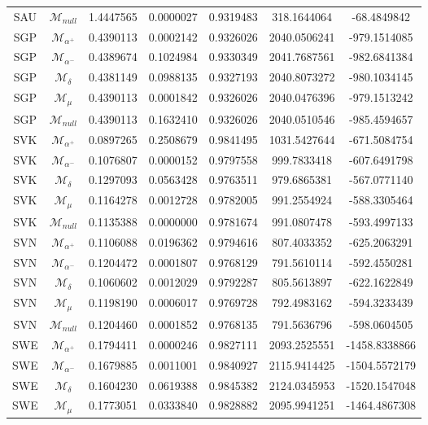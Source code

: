 \begin{tabular}{ccccccc}
SAU & $\mathcal{M}_{null}$ & 1.4447565 & 0.0000027 & 0.9319483 & 318.1644064 & -68.4849842\\
SGP & $\mathcal{M}_{\alpha^+}$ & 0.4390113 & 0.0002142 & 0.9326026 & 2040.0506241 & -979.1514085\\
SGP & $\mathcal{M}_{\alpha^-}$ & 0.4389674 & 0.1024984 & 0.9330349 & 2041.7687561 & -982.6841384\\
SGP & $\mathcal{M}_{\delta}$ & 0.4381149 & 0.0988135 & 0.9327193 & 2040.8073272 & -980.1034145\\
SGP & $\mathcal{M}_{\mu}$ & 0.4390113 & 0.0001842 & 0.9326026 & 2040.0476396 & -979.1513242\\
SGP & $\mathcal{M}_{null}$ & 0.4390113 & 0.1632410 & 0.9326026 & 2040.0510546 & -985.4594657\\
SVK & $\mathcal{M}_{\alpha^+}$ & 0.0897265 & 0.2508679 & 0.9841495 & 1031.5427644 & -671.5084754\\
SVK & $\mathcal{M}_{\alpha^-}$ & 0.1076807 & 0.0000152 & 0.9797558 & 999.7833418 & -607.6491798\\
SVK & $\mathcal{M}_{\delta}$ & 0.1297093 & 0.0563428 & 0.9763511 & 979.6865381 & -567.0771140\\
SVK & $\mathcal{M}_{\mu}$ & 0.1164278 & 0.0012728 & 0.9782005 & 991.2554924 & -588.3305464\\
SVK & $\mathcal{M}_{null}$ & 0.1135388 & 0.0000000 & 0.9781674 & 991.0807478 & -593.4997133\\
SVN & $\mathcal{M}_{\alpha^+}$ & 0.1106088 & 0.0196362 & 0.9794616 & 807.4033352 & -625.2063291\\
SVN & $\mathcal{M}_{\alpha^-}$ & 0.1204472 & 0.0001807 & 0.9768129 & 791.5610114 & -592.4550281\\
SVN & $\mathcal{M}_{\delta}$ & 0.1060602 & 0.0012029 & 0.9792287 & 805.5613897 & -622.1622849\\
SVN & $\mathcal{M}_{\mu}$ & 0.1198190 & 0.0006017 & 0.9769728 & 792.4983162 & -594.3233439\\
SVN & $\mathcal{M}_{null}$ & 0.1204460 & 0.0001852 & 0.9768135 & 791.5636796 & -598.0604505\\
SWE & $\mathcal{M}_{\alpha^+}$ & 0.1794411 & 0.0000246 & 0.9827111 & 2093.2525551 & -1458.8338866\\
SWE & $\mathcal{M}_{\alpha^-}$ & 0.1679885 & 0.0011001 & 0.9840927 & 2115.9414425 & -1504.5572179\\
SWE & $\mathcal{M}_{\delta}$ & 0.1604230 & 0.0619388 & 0.9845382 & 2124.0345953 & -1520.1547048\\
SWE & $\mathcal{M}_{\mu}$ & 0.1773051 & 0.0333840 & 0.9828882 & 2095.9941251 & -1464.4867308\\

\end{tabular}
